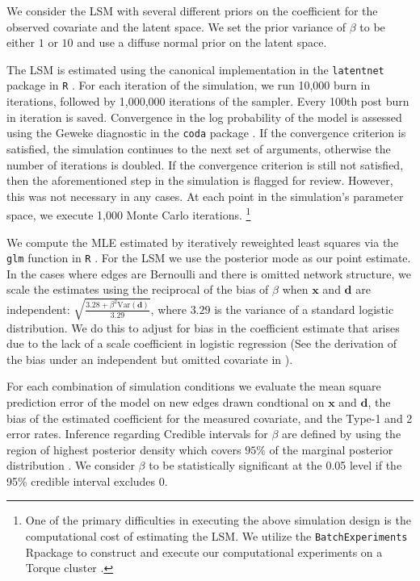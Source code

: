 \documentclass[11pt]{article}
\newcommand{\R}{\textsf{R}\space} %
\begin{document}
We consider the LSM with several different priors on the coefficient for the observed covariate and the latent space. We set the prior variance of $\beta$ to be either $1$ or $10$ and use a diffuse normal prior on the latent space.

The LSM is estimated using the canonical implementation in the \texttt{latentnet} package in \texttt{R} \citep{latentnet}. For each iteration of the simulation, we run 10,000 burn in iterations, followed by 1,000,000 iterations of the sampler. Every 100th post burn in iteration is saved. Convergence in the log probability of the model is assessed using the Geweke diagnostic in the \texttt{coda} package \citep{coda, geweke1991evaluating}. If the convergence criterion is satisfied, the simulation continues to the next set of arguments, otherwise the number of iterations is doubled. If the convergence criterion is still not satisfied, then the aforementioned step in the simulation is flagged for review. However, this was not necessary in any cases. At each point in the simulation's parameter space, we execute 1,000 Monte Carlo iterations. \footnote{One of the primary difficulties in executing the above simulation design is the computational cost of estimating the LSM. We utilize the \texttt{BatchExperiments} \R package to construct and execute our computational experiments on a Torque cluster \cite{bischl2015batchjobs}.}

We compute the MLE estimated by iteratively reweighted least squares via the \texttt{glm} function in \texttt{R} \citep{rcore}. For the LSM we use the posterior mode as our point estimate. In the cases where edges are Bernoulli and there is omitted network structure, we scale the estimates using the reciprocal of the bias of $\beta$ when $\mathbf{x}$ and $\mathbf{d}$ are independent: $\sqrt{\frac{3.28 + \beta^2 \text{Var}(\mathbf{d})}{3.29}}$, where $3.29$ is the variance of a standard logistic distribution. We do this to adjust for bias in the coefficient estimate that arises due to the lack of a scale coefficient in logistic regression (See the derivation of the bias under an independent but omitted covariate in \cite{mood2010logistic}).

For each combination of simulation conditions we evaluate the mean square prediction error of the model on new edges drawn condtional on $\mathbf{x}$ and $\mathbf{d}$, the bias of the estimated coefficient for the measured covariate, and the Type-1 and 2 error rates. Inference regarding Credible intervals for $\beta$ are defined by using the region of highest posterior density which covers $95\%$ of the marginal posterior distribution \cite{turkkan1993computation}. We consider $\beta$ to be statistically significant at the 0.05 level if the 95\% credible interval excludes 0.
\end{document}
